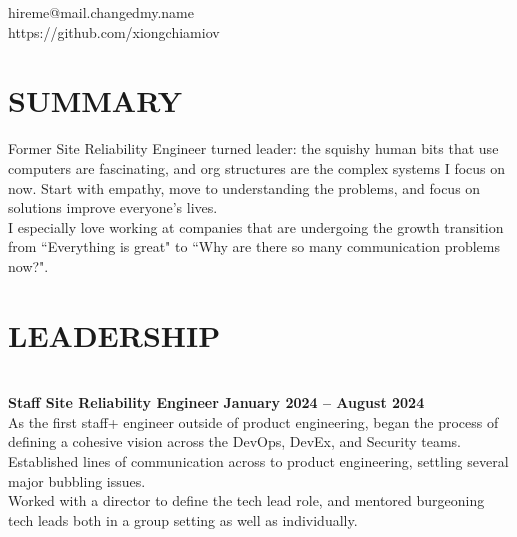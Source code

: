 \documentclass[margin,line]{resume}
\begin{document}
{
    \hfill hireme@mail.changedmy.name       \vspace{0mm}\\\vspace{0mm}%
    \hfill https://github.com/xiongchiamiov \vspace{0mm}\\\vspace{-9mm}%
}

\begin{resume}

    \vspace{-3mm}
    \section{\mysidestyle \textbf{\large{S}\small{UMMARY}}}

    Former Site Reliability Engineer turned leader: the squishy human bits that
    use computers are fascinating, and org structures are the complex systems I
    focus on now.  Start with empathy, move to understanding the problems, and
    focus on solutions improve everyone's lives.
    \vspace{1.7mm}\\%
    I especially love working at companies that are undergoing the growth
    transition from ``Everything is great" to ``Why are there so many
    communication problems now?".

    \vspace{-1mm}

\sectionline
    \section{\mysidestyle \textbf{\large{L}\small{EADERSHIP}}}

    \vspace{1mm}\\%
    \textbf{Staff Site Reliability Engineer} \hfill \textbf{January 2024 -- August 2024}\\
    As the first staff+ engineer outside of product engineering, began the
    process of defining a cohesive vision across the DevOps, DevEx, and
    Security teams.\\
    Established lines of communication across to product engineering, settling
    several major bubbling issues.\\
    Worked with a director to define the tech lead role, and mentored
    burgeoning tech leads both in a group setting as well as individually.


\end{resume}
\end{document}
